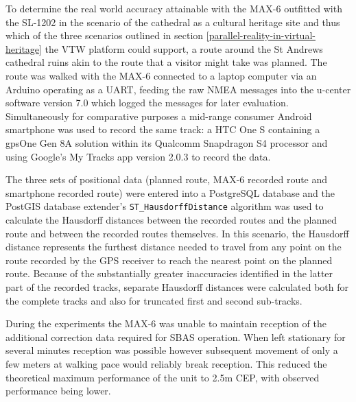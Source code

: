 To determine the real world accuracy attainable with the MAX-6 outfitted with the SL-1202 in the scenario of the cathedral as a cultural heritage site and thus which of the three scenarios outlined in section \ref{parallel-reality-in-virtual-heritage} the VTW platform could support, a route around the St Andrews cathedral ruins akin to the route that a visitor might take was planned. The route was walked with the MAX-6 connected to a laptop computer via an Arduino operating as a UART, feeding the raw NMEA messages into the u-center software version 7.0 which logged the messages for later evaluation. Simultaneously for comparative purposes a mid-range consumer Android smartphone was used to record the same track: a HTC One S\htconesFootnote{} containing a gpsOne Gen 8A solution within its Qualcomm Snapdragon S4 processor\snapdragonFootnote{} and using Google's My Tracks\mytracksFootnote{} app version 2.0.3 to record the data.

The three sets of positional data (planned route, MAX-6 recorded route and smartphone recorded route) were entered into a PostgreSQL database and the PostGIS database extender's \texttt{ST\_HausdorffDistance} algorithm\hausdorffFootnote{} was used to calculate the Hausdorff distances between the recorded routes and the planned route and between the recorded routes themselves. In this scenario, the Hausdorff distance represents the furthest distance needed to travel from any point on the route recorded by the GPS receiver to reach the nearest point on the planned route. Because of the substantially greater inaccuracies identified in the latter part of the recorded tracks, separate Hausdorff distances were calculated both for the complete tracks and also for truncated first and second sub-tracks.


During the experiments the MAX-6 was unable to maintain reception of the additional correction data required for SBAS operation. When left stationary for several minutes reception was possible however subsequent movement of only a few meters at walking pace would reliably break reception. This reduced the theoretical maximum performance of the unit to 2.5m CEP, with observed performance being lower.

